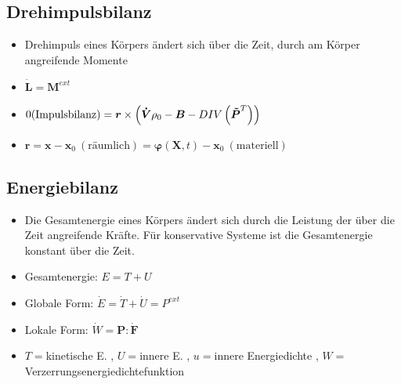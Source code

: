 \documentclass[fleqn,twoside]{article}
\begin{document}
\subsection{Drehimpulsbilanz} 
    \begin{itemize}
        \item Drehimpuls eines Körpers ändert sich über die Zeit, durch am Körper angreifende Momente
        \item $\boldsymbol{\dot{L}}=\boldsymbol{M}^{ext}$
        \item $0 (\text{Impulsbilanz}) =\boldsymbol{r} \times \left( \boldsymbol{\dot{V}} \rho_0 - \boldsymbol{B} - DIV\left(\boldsymbol{\Tilde{P}}^T\right) \right)$
        \item $\boldsymbol{r}=\boldsymbol{x-x}_0 \: (\text{räumlich}) = \boldsymbol{\varphi}(\boldsymbol{X},t) -\boldsymbol{x}_0 \: (\text{materiell}) $
    \end{itemize}
\subsection{Energiebilanz}
\begin{itemize}
    \item Die Gesamtenergie eines Körpers ändert sich durch die Leistung der über die Zeit angreifende Kräfte. Für konservative Systeme ist die Gesamtenergie konstant über die Zeit.
    \item Gesamtenergie: $E=T+U$
    \item Globale Form: $\dot{E}=\dot{T}+\dot{U} = P^{ext}$
    \item Lokale Form: $\dot{W}=\boldsymbol{P} : \boldsymbol{\dot{F}}$
    \item $T=$kinetische E. , $U=$innere E. , $u=$innere Energiedichte , $W =$ Verzerrungsenergiedichtefunktion
\end{itemize}
\end{document}
